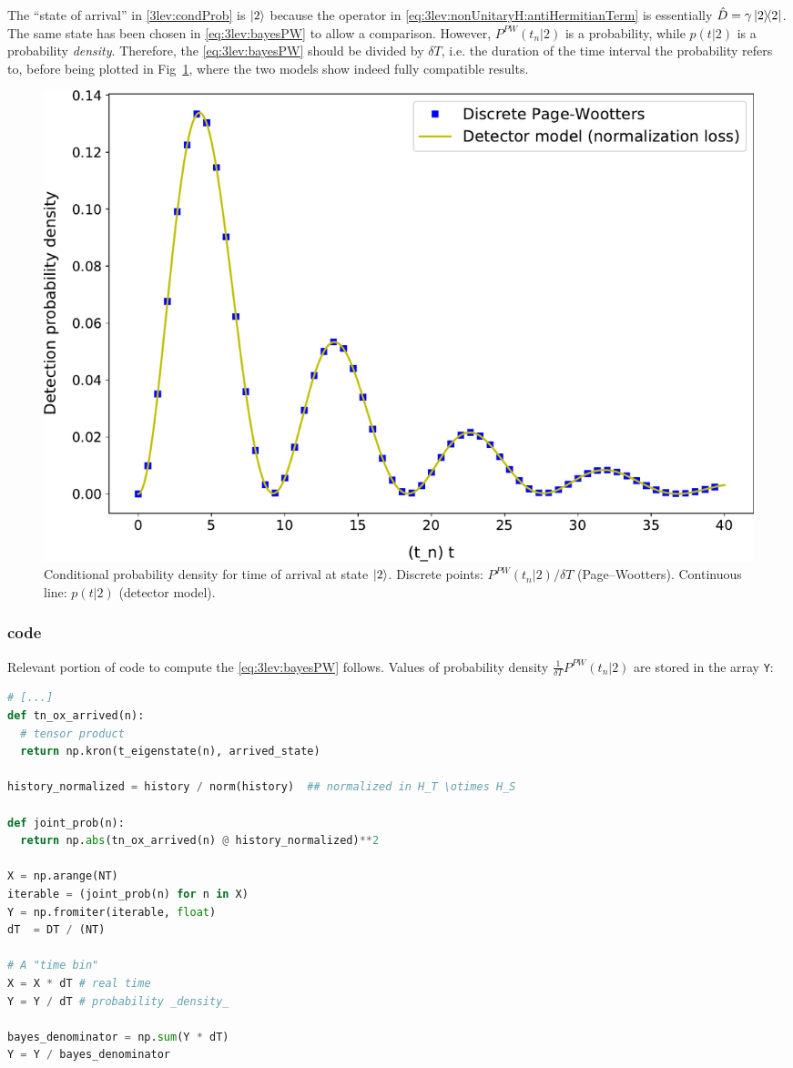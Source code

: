 The ``state of arrival'' in \eqref{3lev:condProb} is $\ket{2}$
because the operator
in \eqref{eq:3lev:nonUnitaryH:antiHermitianTerm}
is essentially $\hat{D} = \gamma \ketbra{2}$. The same
state has been chosen in \eqref{eq:3lev:bayesPW}
to allow a comparison. However, $P^{PW}(t_n|2)$ is a probability,
while $p(t|2)$ is a probability \emph{density}.
Therefore, the \eqref{eq:3lev:bayesPW} should be divided by $\delta T$,
i.e. the duration of the time interval the probability refers to,
before being plotted in Fig~\ref{fig:3lev:condProb},
where the two models show indeed fully compatible results.
\begin{figure}[]
  \centering
  \includegraphics[width=\textwidth]{img/3ldetect/conditionalProbFit.pdf}
  \caption[
    Conditional probability density for time of arrival at state $\ket{2}$.
  ]{
    Conditional probability density for time of arrival at state $\ket{2}$.
    Discrete points: $P^{PW}(t_n|2) / \delta{T}$ (Page--Wootters).
    Continuous line: $p(t|2)$ (detector model).
  }
  \label{fig:3lev:condProb}
\end{figure}

\subsubsection*{ code}

Relevant portion of code to compute the \eqref{eq:3lev:bayesPW} follows.
Values of probability density
$\frac{1}{\delta{T}}  P^{PW}(t_n|2)$
are stored in the array \Verb|Y|:
\begin{lstlisting}[language=Python]
# [...]
def tn_ox_arrived(n):
  # tensor product
  return np.kron(t_eigenstate(n), arrived_state)

history_normalized = history / norm(history)  ## normalized in H_T \otimes H_S

def joint_prob(n):
  return np.abs(tn_ox_arrived(n) @ history_normalized)**2

X = np.arange(NT)
iterable = (joint_prob(n) for n in X)
Y = np.fromiter(iterable, float)
dT  = DT / (NT)

# A "time bin"
X = X * dT # real time
Y = Y / dT # probability _density_

bayes_denominator = np.sum(Y * dT)
Y = Y / bayes_denominator
\end{lstlisting}

